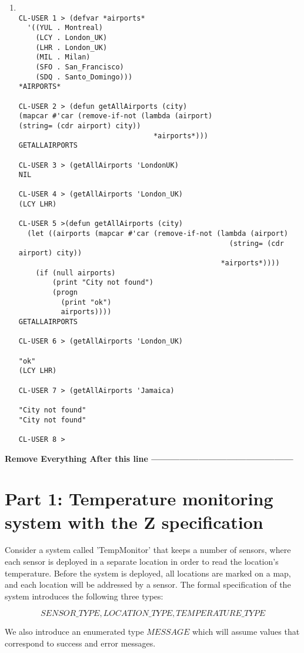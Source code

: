 \documentclass[12pt]{article}
\begin{document}
\begin{enumerate}
\item
\begin{verbatim}

CL-USER 1 > (defvar *airports*
  '((YUL . Montreal)
    (LCY . London_UK)
    (LHR . London_UK)
    (MIL . Milan)
    (SFO . San_Francisco)
    (SDQ . Santo_Domingo)))
*AIRPORTS*

CL-USER 2 > (defun getAllAirports (city)
(mapcar #'car (remove-if-not (lambda (airport)
(string= (cdr airport) city))
                                *airports*)))
GETALLAIRPORTS

CL-USER 3 > (getAllAirports 'LondonUK)
NIL

CL-USER 4 > (getAllAirports 'London_UK)
(LCY LHR)

CL-USER 5 >(defun getAllAirports (city)
  (let ((airports (mapcar #'car (remove-if-not (lambda (airport)
                                                  (string= (cdr airport) city))
                                                *airports*))))
    (if (null airports)
        (print "City not found")
        (progn
          (print "ok")
          airports))))
GETALLAIRPORTS

CL-USER 6 > (getAllAirports 'London_UK)

"ok" 
(LCY LHR)

CL-USER 7 > (getAllAirports 'Jamaica)

"City not found" 
"City not found"

CL-USER 8 > 
\end{verbatim}
\end{enumerate}

\textbf{Remove Everything After this line ---------------------------------------------}\\
\newpage

\section*{Part 1:  Temperature monitoring system with the Z specification}

Consider a system called 'TempMonitor' that keeps a number of sensors, where each sensor is deployed in a separate location in order to read the location's temperature. Before the system is deployed, all locations are marked on a map, and each location will be addressed by a sensor. The formal specification of the system introduces the following three types:

\[ SENSOR\_TYPE,  LOCATION\_TYPE, TEMPERATURE\_TYPE  \]

\noindent We also introduce an enumerated type $MESSAGE$ which will assume values that correspond to success and error messages.\\
\end{document}
